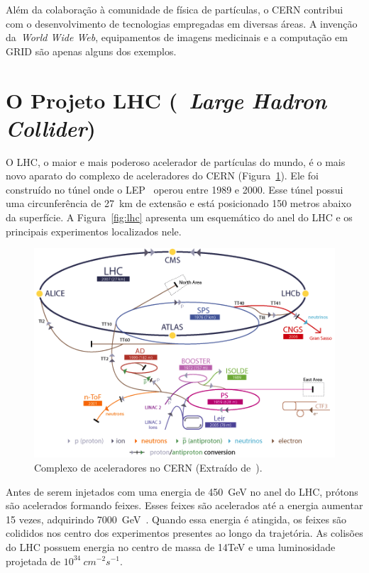 Além da colaboração à comunidade de física de partículas, o CERN contribui com
o desenvolvimento de tecnologias empregadas em diversas áreas. A invenção
da~\emph{World Wide Web}, equipamentos de imagens medicinais e a computação em
GRID são apenas alguns dos exemplos.

\section{O Projeto LHC (~\emph{Large Hadron Collider})}

O LHC, o maior e mais poderoso acelerador de partículas do mundo, é o mais novo
aparato do complexo de aceleradores do CERN (Figura~\ref{fig:cerncomplex}). Ele
foi construído no túnel onde o LEP~\cite{ref:PICASSO1990} operou entre 1989 e
2000.  Esse túnel possui uma circunferência de 27~km de extensão e está
posicionado 150 metros abaixo da superfície. A Figura~\ref{fig:lhc} apresenta
um esquemático do anel do LHC e os principais experimentos localizados nele.

\begin{figure}[htpb!]
    \centering
    \includegraphics[width=12cm]{images/complexo_acelerador_CERN.png}
    \caption[Complexo de aceleradores no CERN.]{Complexo de aceleradores no CERN
    (Extraído de~\cite{ref:solans}).}
    \label{fig:cerncomplex}
\end{figure}

Antes de serem injetados com uma energia de 450~GeV no anel do LHC, prótons são
acelerados formando feixes. Esses feixes são acelerados até a energia
aumentar 15 vezes, adquirindo 7000~GeV~\cite{ref:solans}. Quando essa energia é
atingida, os feixes são colididos nos centro dos experimentos presentes ao longo
da trajetória. As colisões do LHC possuem energia no centro de massa de 14TeV e
uma luminosidade projetada  de $10^{34}~cm^{-2}s^{-1}$.

